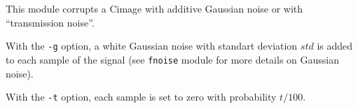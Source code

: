 This module corrupts a Cimage with additive Gaussian noise
or with ``transmission noise''. 

\medskip

With the \verb+-g+ option, a white Gaussian noise with standart deviation $std$
is added to each sample of the signal (see \verb+fnoise+ module for
more details on Gaussian noise).

\medskip

With the \verb+-t+ option, each sample is set to zero with probability
$t/100$.
